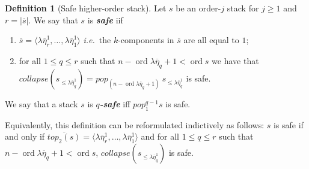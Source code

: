 \documentclass{article}
\newcommand{\ord}{\mathop{\mathrm{ord}}}
\newcommand{\prefixof}{\leqslant}
\newcommand\defname[1]{{\bf\em #1}\index{#1}}
\newtheorem{lemma}{Lemma}[section]
\theoremstyle{remark}
\theoremstyle{definition}
\newtheorem{definition}{Definition}[section]
\newcommand\orddec\overline
\def\ie{{\it i.e.}\ }
\begin{document}
\begin{definition}[Safe higher-order stack]
\label{dfn:safestack} Let $s$ be an order-$j$ stack for $j\geq1$ and $r
= |\orddec{s}|$.
We say that $s$ is \defname{safe} iif
    \begin{enumerate}[1.]
    \item $\orddec{s} = \langle \lambda \overline{\eta}_r^1, \ldots ,
    \lambda \overline{\eta}_1^1 \rangle$ \ie the $k$-components in $\orddec{s}$ are all equal to $1$;
    \item for all $1 \leq q \leq r$ such that $n-\ord{\lambda \overline{\eta}_q}+1 < \ord{s}$ we have that
    $collapse (s_{\prefixof \lambda \overline{\eta}_q^1}) = pop_{(n-\ord{\lambda \overline{\eta}_q}+1)}\  s_{\prefixof \lambda \overline{\eta}_q^1}$ is safe.
    \end{enumerate}
We say that a stack $s$ is \defname{$q$-safe} iff $pop_1^{q-1} s$ is safe.
\end{definition}

Equivalently, this definition can be reformulated indictively as follows:
$s$ is safe if and only if
    $\orddec{top_2(s)} = \langle \lambda \overline{\eta}_r^1, \ldots ,
    \lambda \overline{\eta}_1^1 \rangle$
    and for all $1 \leq q \leq r$ such that $n-\ord{\lambda \overline{\eta}_q}+1 < \ord{s}$,
    $collapse (s_{\prefixof \lambda \overline{\eta}_q^1})$ is safe.


%
%
\end{document}
